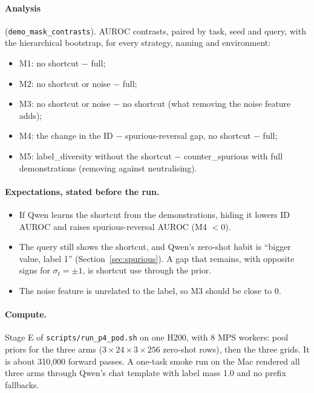 \documentclass[11pt,a4paper]{article}
\newcommand{\1}{\mathbf{1}}
\theoremstyle{plain}
\theoremstyle{definition}
\theoremstyle{remark}
\begin{document}
\paragraph{Analysis} (\texttt{demo\_mask\_contrasts}). AUROC contrasts,
paired by task, seed and query, with the hierarchical bootstrap, for every
strategy, naming and environment:
\begin{itemize}[nosep]
  \item M1: no shortcut $-$ full;
  \item M2: no shortcut or noise $-$ full;
  \item M3: no shortcut or noise $-$ no shortcut (what removing the noise feature adds);
  \item M4: the change in the ID $-$ spurious-reversal gap, no shortcut $-$ full;
  \item M5: label\_diversity without the shortcut $-$ counter\_spurious with full
        demonstrations (removing against neutralising).
\end{itemize}

\paragraph{Expectations, stated before the run.}
\begin{itemize}[nosep]
  \item If Qwen learns the shortcut from the demonstrations, hiding it lowers
        ID AUROC and raises spurious-reversal AUROC (M4 $< 0$).
  \item The query still shows the shortcut, and Qwen's zero-shot habit is
        ``bigger value, label 1'' (Section~\ref{sec:spurious}). A gap that
        remains, with opposite signs for $\sigma_t = \pm 1$, is shortcut use
        through the prior.
  \item The noise feature is unrelated to the label, so M3 should be close to 0.
\end{itemize}

\paragraph{Compute.} Stage E of \texttt{scripts/run\_p4\_pod.sh} on one H200,
with 8 MPS workers: pool priors for the three arms ($3 \times 24 \times 3
\times 256$ zero-shot rows), then the three grids. It is about 310{,}000 forward
passes. A one-task smoke run on the Mac rendered all three arms
through Qwen's chat template with label mass 1.0 and no prefix fallbacks.
\end{document}

